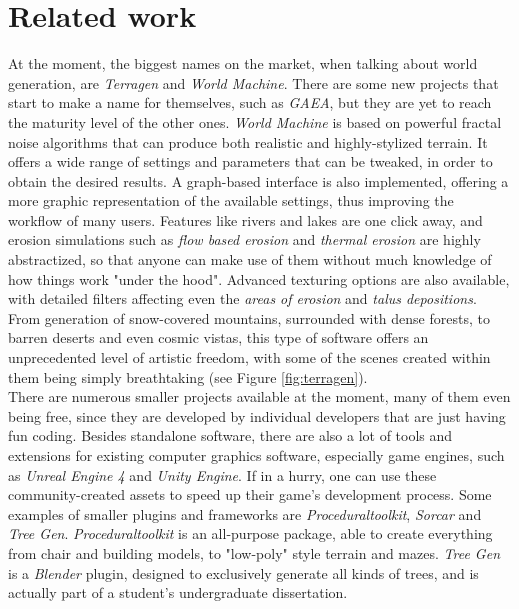 \chapter{Related work}

\pagestyle{fancy}

\label{relatedWork}

At the moment, the biggest names on the market, when talking about world generation, are \textit{Terragen}\cite{terragen} and \textit{World Machine}\cite{worldMachine}. There are some new projects that start to make a name for themselves, such as \textit{GAEA}\cite{gaea}, but they are yet to reach the maturity level of the other ones. \textit{World Machine} is based on powerful fractal noise algorithms that can produce both realistic and highly-stylized terrain. It offers a wide range of settings and parameters that can be tweaked, in order to obtain the desired results. A graph-based interface is also implemented, offering a more graphic representation of the available settings, thus improving the workflow of many users. Features like rivers and lakes are one click away, and erosion simulations such as \textit{flow based erosion} and \textit{thermal erosion} are highly abstractized, so that anyone can make use of them without much knowledge of how things work "under the hood". Advanced texturing options are also available, with detailed filters affecting even the \textit{areas of erosion} and \textit{talus depositions}. From generation of snow-covered mountains, surrounded with dense forests, to barren deserts and even cosmic vistas, this type of software offers an unprecedented level of artistic freedom, with some of the scenes created within them being simply breathtaking (see Figure \ref{fig:terragen}).\\

There are numerous smaller projects available at the moment, many of them even being free, since they are developed by individual developers that are just having fun coding. Besides standalone software, there are also a lot of tools and extensions for existing computer graphics software, especially game engines, such as \textit{Unreal Engine 4} and \textit{Unity Engine}. If in a hurry, one can use these community-created assets to speed up their game's development process. Some examples of smaller plugins and frameworks are \textit{Proceduraltoolkit}, \textit{Sorcar} and \textit{Tree Gen}. \textit{Proceduraltoolkit} is an all-purpose package, able to create everything from chair and building models, to "low-poly" style terrain and mazes. \textit{Tree Gen} is a \textit{Blender} plugin, designed to exclusively generate all kinds of trees, and is actually part of a student's undergraduate dissertation\cite{hewitt2017procedural}.\\

